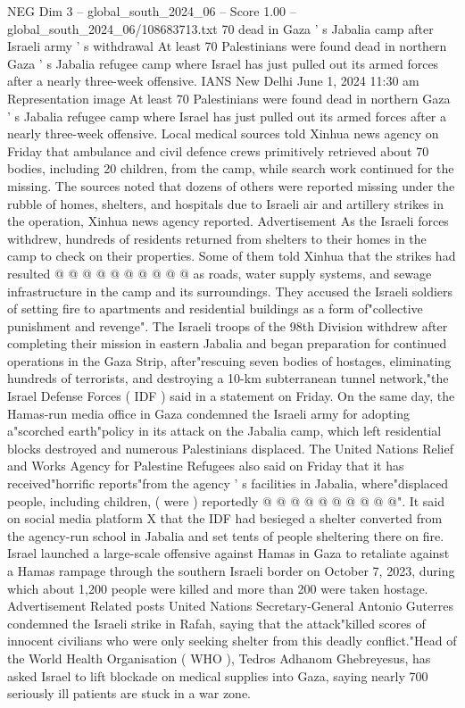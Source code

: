 \begin{textsample}{NEG Dim 3 – global\_south\_2024\_06 – Score 1.00 – global\_south\_2024\_06/108683713.txt}  \label{ex:f3_neg_111}
70 dead in Gaza ' s Jabalia camp after Israeli army ' s withdrawal At least 70 Palestinians were found dead in northern Gaza ' s Jabalia refugee camp where Israel has just pulled out its armed forces after a nearly three-week offensive.
IANS New Delhi June 1, 2024 11:30 am Representation image At least 70 Palestinians were found dead in northern Gaza ' s Jabalia refugee camp where Israel has just pulled out its armed forces after a nearly three-week offensive.
Local medical sources told Xinhua news agency on Friday that ambulance and civil defence crews primitively retrieved about 70 bodies, including 20 children, from the camp, while search work continued for the missing.
The sources noted that dozens of others were reported missing under the rubble of homes, shelters, and hospitals due to Israeli air and artillery strikes in the operation, Xinhua news agency reported.
Advertisement As the Israeli forces withdrew, hundreds of residents returned from shelters to their homes in the camp to check on their properties.
Some of them told Xinhua that the strikes had resulted @ @ @ @ @ @ @ @ @ @ as roads, water supply systems, and sewage infrastructure in the camp and its surroundings.
They accused the Israeli soldiers of setting fire to apartments and residential buildings as a form of"collective punishment and revenge".
The Israeli troops of the 98th Division withdrew after completing their mission in eastern Jabalia and began preparation for continued operations in the Gaza Strip, after"rescuing seven bodies of hostages, eliminating hundreds of terrorists, and destroying a 10-km subterranean tunnel network,"the Israel Defense Forces ( IDF ) said in a statement on Friday.
On the same day, the Hamas-run media office in Gaza condemned the Israeli army for adopting a"scorched earth"policy in its attack on the Jabalia camp, which left residential blocks destroyed and numerous Palestinians displaced.
The United Nations Relief and Works Agency for Palestine Refugees also said on Friday that it has received"horrific reports"from the agency ' s facilities in Jabalia, where"displaced people, including children, ( were ) reportedly @ @ @ @ @ @ @ @ @ @".
It said on social media platform X that the IDF had besieged a shelter converted from the agency-run school in Jabalia and set tents of people sheltering there on fire.
Israel launched a large-scale offensive against Hamas in Gaza to retaliate against a Hamas rampage through the southern Israeli border on October 7, 2023, during which about 1,200 people were killed and more than 200 were taken hostage.
Advertisement Related posts United Nations Secretary-General Antonio Guterres condemned the Israeli strike in Rafah, saying that the attack"killed scores of innocent civilians who were only seeking shelter from this deadly conflict."Head of the World Health Organisation ( WHO ), Tedros Adhanom Ghebreyesus, has asked Israel to lift blockade on medical supplies into Gaza, saying nearly 700 seriously ill patients are stuck in a war zone.

\end{textsample}
